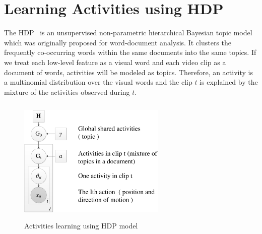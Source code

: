 \section{Learning Activities using HDP}
\label{hdp for activities}
The HDP~\cite{teh2006hdp} is an unsupervised non-parametric hierarchical Bayesian topic model which was originally proposed for word-document analysis. It clusters the frequently co-occurring words within the same documents into the same topics. If we treat each low-level feature as a visual word and each video clip as a document of words, activities will be modeled as topics. Therefore, an activity is a multinomial distribution over the visual words and the clip $t$ is explained by the mixture of the activities observed during $t$. 

\begin{figure}[t!]
	\center
	\includegraphics[width=7cm, height =6cm]{figures/HDP_graph-crop.pdf}
	\caption{Activities learning using HDP model}
	\label{hdp_graph}
\end{figure}

